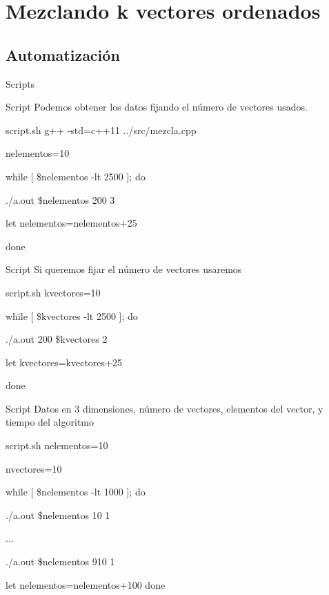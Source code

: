 
\section{Mezclando k vectores ordenados}

\subsection{Automatización}
\begin{frame}{Scripts}
	\begin{block}{Script}
		Podemos obtener los datos fijando el n\'umero de vectores usados.
	\end{block}
	
	\begin{exampleblock}{script.sh}
	g++ -std=c++11 ../src/mezcla.cpp

	nelementos=10

	while [ \$nelementos -lt 2500 ]; do
    
    		./a.out \$nelementos 200 3
    
    		let nelementos=nelementos+25
	
	done
	\end{exampleblock}
\end{frame}


\begin{frame}
	\begin{block}{Script}
		Si queremos fijar el n\'umero de vectores usaremos
	\end{block}
	
	\begin{exampleblock}{script.sh}
	kvectores=10

	while [ \$kvectores -lt 2500 ]; do
    
    		./a.out 200 \$kvectores 2
    	
    		let kvectores=kvectores+25

	done
	\end{exampleblock}
\end{frame}


\begin{frame}
	\begin{block}{Script}
	Datos en 3 dimensiones, número de vectores, elementos del vector, y tiempo del algoritmo
	\end{block}
	
	\begin{exampleblock}{script.sh}
	nelementos=10

	nvectores=10

	while [ \$nelementos -lt 1000 ]; do
   	
   		./a.out \$nelementos 10 1
      		
   		...
   		
   		./a.out \$nelementos 910 1

   		let nelementos=nelementos+100
	done
	\end{exampleblock}
\end{frame}

